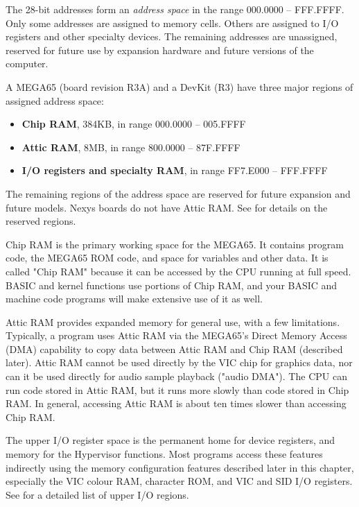 The 28-bit addresses form an {\em address space} in the range 000.0000
-- FFF.FFFF. Only some addresses are assigned to memory cells. Others are assigned to I/O
registers and other specialty devices. The remaining addresses are unassigned, reserved
for future use by expansion hardware and future versions of the computer.

A MEGA65 (board revision R3A) and a DevKit (R3) have three major regions of
assigned address space:

\begin{itemize}
\item {\bf Chip RAM}, 384KB, in range 000.0000 -- 005.FFFF
\item {\bf Attic RAM}, 8MB, in range 800.0000 -- 87F.FFFF
\item {\bf I/O registers and specialty RAM}, in range FF7.E000 -- FFF.FFFF
\end{itemize}

The remaining regions of the address space are reserved for future expansion
and future models. Nexys boards do not have Attic RAM. See
 for details on the reserved regions.

Chip RAM is the primary working space for the MEGA65. It contains program code,
the MEGA65 ROM code, and space for variables and other data. It is called "Chip
RAM" because it can be accessed by the CPU running at full speed. BASIC and
kernel functions use portions of Chip RAM, and your BASIC and machine code
programs will make extensive use of it as well.

Attic RAM provides expanded memory for general use, with a few limitations.
Typically, a program uses Attic RAM via the MEGA65's Direct Memory Access (DMA) capability to
copy data between Attic RAM and Chip RAM (described later). Attic RAM cannot be used directly by the VIC
chip for graphics data, nor can it be used directly for audio sample playback
("audio DMA"). The CPU can run code stored in Attic RAM, but it runs more
slowly than code stored in Chip RAM. In general, accessing Attic RAM is about
ten times slower than accessing Chip RAM.

The upper I/O register space is the permanent home for device registers, and
memory for the Hypervisor functions. Most programs access these features
indirectly using the memory configuration features described later in this
chapter, especially the VIC colour RAM, character ROM, and VIC and SID I/O
registers. See  for a detailed list of upper I/O regions.


